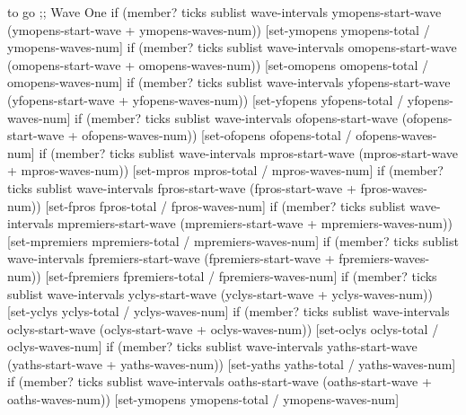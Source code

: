 \documentclass[12pt]{article}
\begin{document}
to go
  ;; Wave One
  if (member? ticks sublist wave-intervals ymopens-start-wave (ymopens-start-wave + ymopens-waves-num)) [set-ymopens ymopens-total / ymopens-waves-num]
  if (member? ticks sublist wave-intervals omopens-start-wave (omopens-start-wave + omopens-waves-num)) [set-omopens omopens-total / omopens-waves-num]
  if (member? ticks sublist wave-intervals yfopens-start-wave (yfopens-start-wave + yfopens-waves-num)) [set-yfopens yfopens-total / yfopens-waves-num]
  if (member? ticks sublist wave-intervals ofopens-start-wave (ofopens-start-wave + ofopens-waves-num)) [set-ofopens ofopens-total / ofopens-waves-num]
  if (member? ticks sublist wave-intervals mpros-start-wave (mpros-start-wave + mpros-waves-num)) [set-mpros mpros-total / mpros-waves-num]
  if (member? ticks sublist wave-intervals fpros-start-wave (fpros-start-wave + fpros-waves-num)) [set-fpros fpros-total / fpros-waves-num]
  if (member? ticks sublist wave-intervals mpremiers-start-wave (mpremiers-start-wave + mpremiers-waves-num)) [set-mpremiers mpremiers-total / mpremiers-waves-num]
  if (member? ticks sublist wave-intervals fpremiers-start-wave (fpremiers-start-wave + fpremiers-waves-num)) [set-fpremiers fpremiers-total / fpremiers-waves-num]
  if (member? ticks sublist wave-intervals yclys-start-wave (yclys-start-wave + yclys-waves-num)) [set-yclys yclys-total / yclys-waves-num]
  if (member? ticks sublist wave-intervals oclys-start-wave (oclys-start-wave + oclys-waves-num)) [set-oclys oclys-total / oclys-waves-num]
  if (member? ticks sublist wave-intervals yaths-start-wave (yaths-start-wave + yaths-waves-num)) [set-yaths yaths-total / yaths-waves-num]
  if (member? ticks sublist wave-intervals oaths-start-wave (oaths-start-wave + oaths-waves-num)) [set-ymopens ymopens-total / ymopens-waves-num]
  
\end{document}
